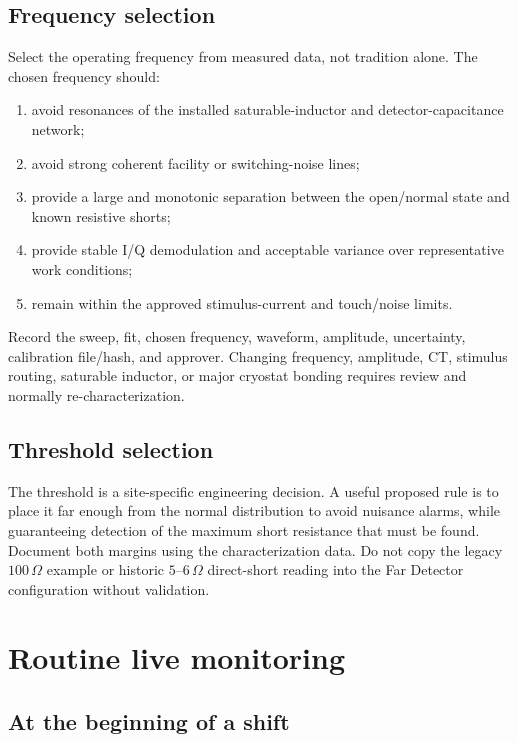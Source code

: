 \documentclass[11pt]{article}
\begin{document}
\subsection{Frequency selection}

Select the operating frequency from measured data, not tradition alone. The chosen frequency should:

\begin{enumerate}
  \item avoid resonances of the installed saturable-inductor and detector-capacitance network;
  \item avoid strong coherent facility or switching-noise lines;
  \item provide a large and monotonic separation between the open/normal state and known resistive shorts;
  \item provide stable I/Q demodulation and acceptable variance over representative work conditions;
  \item remain within the approved stimulus-current and touch/noise limits.
\end{enumerate}

Record the sweep, fit, chosen frequency, waveform, amplitude, uncertainty, calibration file/hash, and approver. Changing frequency, amplitude, CT, stimulus routing, saturable inductor, or major cryostat bonding requires review and normally re-characterization.

\subsection{Threshold selection}

The threshold is a site-specific engineering decision. A useful proposed rule is to place it far enough from the normal distribution to avoid nuisance alarms, while guaranteeing detection of the maximum short resistance that must be found. Document both margins using the characterization data. Do not copy the legacy $100\,\Omega$ example or historic $5$--$6\,\Omega$ direct-short reading into the Far Detector configuration without validation.

\section{Routine live monitoring}

\subsection{At the beginning of a shift}
\end{document}
